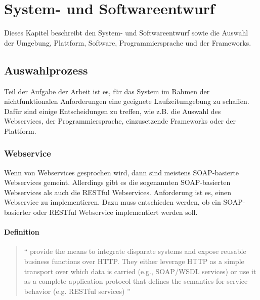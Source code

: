 \chapter{System- und Softwareentwurf} \label{kap:systemundsoftwarentwurf}


Dieses Kapitel beschreibt den System- und Softwareentwurf sowie die Auswahl der Umgebung, Plattform, Software, Programmiersprache und der Frameworks.

\section{Auswahlprozess}

Teil der Aufgabe der Arbeit ist es, für das System im Rahmen der nichtfunktionalen Anforderungen eine geeignete Laufzeitumgebung zu schaffen. Dafür sind einige Entscheidungen zu treffen, wie z.B. die Auswahl des Webservices, der Programmiersprache, einzusetzende Frameworks oder der Plattform. 

\subsection{Webservice}\label{sec:webservice}
Wenn von \glspl{Webservice} gesprochen wird, dann sind meistens \gls{SOAP}-basierte \glspl{Webservice} gemeint. Allerdings gibt es die sogenannten \gls{SOAP}-basierten \glspl{Webservice} als auch die \gls{REST}ful \glspl{Webservice}. Anforderung ist es, einen \gls{Webservice} zu implementieren. Dazu muss entschieden werden, ob ein \gls{SOAP}-basierter oder \gls{REST}ful \gls{Webservice} implementiert werden soll. 

\subsubsection{Definition}

\begin{quotation}
\enquote{ provide the means to integrate disparate systems and expose reusable business functions over \gls{HTTP}. They either leverage \gls{HTTP} as a simple transport over which data is carried (e.g., \gls{SOAP}/\gls{WSDL} services) or use it as a complete application protocol that defines the semantics for service behavior (e.g. RESTful services) \citep[S. 2][]{robinsonService}}	
\end{quotation}

